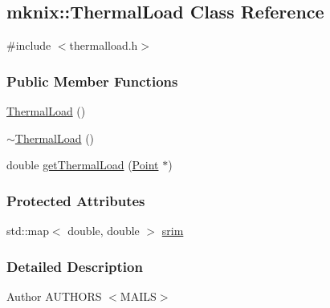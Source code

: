 \hypertarget{classmknix_1_1_thermal_load}{\subsection{mknix\-:\-:Thermal\-Load Class Reference}
\label{classmknix_1_1_thermal_load}
}


{\ttfamily \#include $<$thermalload.\-h$>$}

\subsubsection*{Public Member Functions}
\begin{DoxyCompactItemize}
\item 
\hyperlink{classmknix_1_1_thermal_load_aa285b4200931ad7cd734d7eea28a9cf4}{Thermal\-Load} ()
\item 
\hyperlink{classmknix_1_1_thermal_load_a6932bfdd9473e55e2182bce35ad0a1bf}{$\sim$\-Thermal\-Load} ()
\item 
double \hyperlink{classmknix_1_1_thermal_load_aa0c9087704913f2f675e4dd2da25661a}{get\-Thermal\-Load} (\hyperlink{classmknix_1_1_point}{Point} $\ast$)
\end{DoxyCompactItemize}
\subsubsection*{Protected Attributes}
\begin{DoxyCompactItemize}
\item 
std\-::map$<$ double, double $>$ \hyperlink{classmknix_1_1_thermal_load_a96b2bf86fa9a1e4b2543c4c1f822dd0e}{srim}
\end{DoxyCompactItemize}


\subsubsection{Detailed Description}
\begin{DoxyAuthor}{Author}
A\-U\-T\-H\-O\-R\-S $<$\-M\-A\-I\-L\-S$>$ 
\end{DoxyAuthor}


